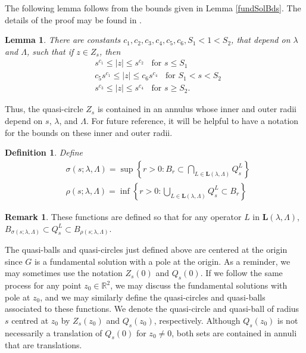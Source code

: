 \documentclass[12pt,reqno]{amsart}
\theoremstyle{plain}
\newtheorem{lem}{Lemma}
\newtheorem{defn}{Definition}
\theoremstyle{definition}
\newtheorem*{rem}{Remark}
\newcommand{\la}{\lambda}
\newcommand{\La}{\Lambda}
\newcommand{\si}{\sigma}
\newcommand{\su}{\subset}
\newcommand{\abs}[1]{\left\vert#1\right\vert}
\newcommand{\set}[1]{\left\{#1\right\}}
\newcommand{\pr}[1]{\left( #1 \right) }
\newcommand{\R}{\ensuremath{\mathbb{R}}}
\begin{document}
The following lemma follows from the bounds given in Lemma \ref{fundSolBds}.
The details of the proof may be found in \cite{DKW17}.

\begin{lem}
There are constants $c_1, c_2, c_3, c_4, c_5, c_6, S_1 < 1 < S_2$, that depend on $\la$ and $\La$, such that if $z \in Z_s$, then
\begin{align*}
& s^{c_1} \le \abs{z} \le s^{c_2}  \;\; \text{ for } s \le S_1 \\
& c_5 s^{c_1} \le \abs{z} \le c_6 s^{c_4} \;\; \text{ for } S_1 < s < S_2 \\
& s^{c_3} \le \abs{z} \le s^{c_4} \;\; \text{ for } s \ge S_2.
\end{align*}
\label{ZsBounds}
\end{lem}

Thus, the quasi-circle $Z_s$ is contained in an annulus whose inner and outer radii depend on $s$, $\la$, and $\La$.
For future reference, it will be helpful to have a notation for the bounds on these inner and outer radii.

\begin{defn}
Define
\begin{align*}
& \si\pr{s; \la, \La} = \sup\set{ r > 0 : B_r \su \bigcap_{L \in \mathbf{L}\pr{\la, \La}} Q_s^L } \\
& \rho\pr{s; \la, \La} = \inf \set{r > 0 : \bigcup_{L \in \mathbf{L}\pr{\la, \La}} Q_s^L \su B_r }
\end{align*}
\end{defn}

\begin{rem}
These functions are defined so that for any operator $L$ in $\mathbf{L}\pr{\la, \La}$, $B_{\si\pr{s; \la, \La}} \su Q^L_s \su B_{\rho\pr{s;\la, \La}}$.
\end{rem}

The quasi-balls and quasi-circles just defined above are centered at the origin since $G$ is a fundamental solution with a pole at the origin.
As a reminder, we may sometimes use the notation $Z_s\pr{0}$ and $Q_s\pr{0}$.
If we follow the same process for any point $z_0 \in \R^2$, we may discuss the fundamental solutions with pole at $z_0$, and we may similarly define the quasi-circles and quasi-balls associated to these functions.
We denote the quasi-circle and quasi-ball of radius $s$ centred at $z_0$ by $Z_s\pr{z_0}$ and $Q_s\pr{z_0}$, respectively.
Although $Q_s\pr{z_0}$ is not necessarily a translation of $Q_s\pr{0}$ for $z_0 \ne 0$, both sets are contained in annuli that are translations.
\end{document}
